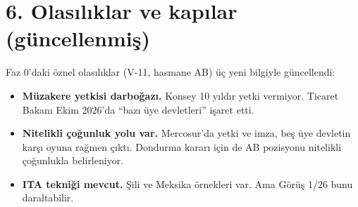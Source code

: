 \hypertarget{02b_secenekler_hukuk-6-olasux131lux131klar-ve-kapux131lar-guxfcncellenmiux15f}{%
\section{6. Olasılıklar ve kapılar (güncellenmiş)}\label{02b_secenekler_hukuk-6-olasux131lux131klar-ve-kapux131lar-guxfcncellenmiux15f}}

Faz 0'daki öznel olasılıklar (V-11, hasmane AB) üç yeni bilgiyle güncellendi:

\begin{itemize}
\tightlist
\item
  \textbf{Müzakere yetkisi darboğazı.} Konsey 10 yıldır yetki vermiyor. Ticaret Bakanı Ekim 2026'da ``bazı üye devletleri'' işaret etti.
\item
  \textbf{Nitelikli çoğunluk yolu var.} Mercosur'da yetki ve imza, beş üye devletin karşı oyuna rağmen çıktı. Dondurma kararı için de AB pozisyonu nitelikli çoğunlukla belirleniyor.
\item
  \textbf{ITA tekniği mevcut.} Şili ve Meksika örnekleri var. Ama Görüş 1/26 bunu daraltabilir.
\end{itemize}

\begingroup\gbtablo\footnotesize

